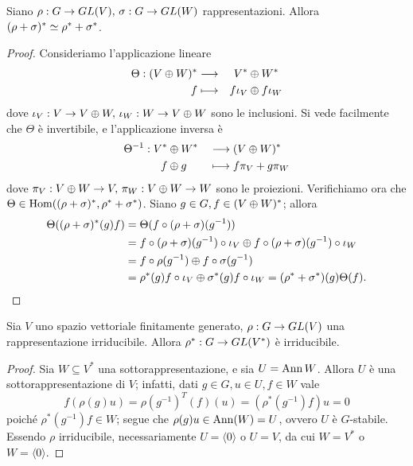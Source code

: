 \begin{proposition}
Siano $\rho:G\to GL(V),\,\allowbreak\sigma:G\to GL(W)$ rappresentazioni. Allora $(\rho+\sigma)^*\simeq\rho^*+\sigma^*$.
\end{proposition}
\begin{proof}
Consideriamo l'applicazione lineare
\begin{alignat*}{3}
\Theta:(V\oplus W)^*&\longrightarrow &V^*&\oplus W^*\\
f&\longmapsto &f\iota_V&\oplus f\iota_W
\end{alignat*}
dove $\iota_V:V\to V\oplus W,\,\allowbreak\iota_W:W\to V\oplus W$ sono le inclusioni. Si vede facilmente che $\Theta$ è invertibile, e l'applicazione inversa è
\begin{alignat*}{2}
\Theta^{-1}:V^*&\oplus W^*&&\longrightarrow(V\oplus W)^*\\
f&\oplus g&&\longmapsto f\pi_V+g\pi_W
\end{alignat*}
dove $\pi_V:V\oplus W\to V,\,\allowbreak\pi_W:V\oplus W\to W$ sono le proiezioni. Verifichiamo ora che $\Theta\in\operatorname{Hom}((\rho+\sigma)^*,\rho^*+\sigma^*)$. Siano $g\in G,f\in(V\oplus W)^*$; allora
\begin{align*}
\Theta((\rho+\sigma)^*(g)f)&=\Theta(f\circ(\rho+\sigma)(g^{-1}))\\
&=f\circ(\rho+\sigma)(g^{-1})\circ\iota_V\oplus f\circ(\rho+\sigma)(g^{-1})\circ\iota_W\\
&=f\circ\rho(g^{-1})\oplus f\circ\sigma(g^{-1})\\
&=\rho^*(g)f\circ\iota_V\oplus\sigma^*(g)f\circ\iota_W=(\rho^*+\sigma^*)(g)\Theta(f).
\end{align*}
\end{proof}

\begin{proposition}
Sia $V$ uno spazio vettoriale finitamente generato, $\rho:G\to GL(V)$ una rappresentazione irriducibile. Allora $\rho^*:G\to GL(V^*)$ è irriducibile.
\end{proposition}
\begin{proof}
Sia $W\subseteq V^*$ una sottorappresentazione, e sia $U=\operatorname{Ann} W$. Allora $U$ è una sottorappresentazione di $V$; infatti, dati $g\in G\comma u\in U\comma f\in W$ vale
$$
f(\rho(g)u)=\rho(g^{-1})^T(f)(u)=(\rho^*(g^{-1})f)u=0
$$
poiché $\rho^*(g^{-1})f\in W$; segue che $\rho(g)u\in\operatorname{Ann}(W)=U$, ovvero $U$ è $G$-stabile. Essendo $\rho$ irriducibile, necessariamente $U=\langle 0\rangle$ o $U=V$, da cui $W=V^*$ o $W=\langle 0\rangle$.
\end{proof}

